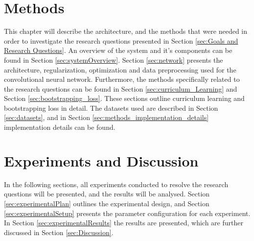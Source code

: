 \documentclass[a4paper]{book}
\begin{document}
\chapter{Methods}
\label{cha:architectureAndModel}
This chapter will describe the architecture, and the methods that were needed in order to investigate the research questions presented in Section \ref{sec:Goals and Research Questions}. An overview of the system and it's components can be found in Section \ref{sec:systemOverview}. Section \ref{sec:network} presents the architecture, regularization, optimization and data preprocessing used for the convolutional neural network. Furthermore, the methods specifically related to the research questions can be found in Section \ref{sec:curriculum_Learning} and Section \ref{sec:bootstrapping_loss}. These sections outline curriculum learning and bootstrapping loss in detail. The datasets used are described in Section \ref{sec:datasets}, and in Section \ref{sec:methods_implementation_details} implementation details can be found.














\chapter{Experiments and Discussion}
In the following sections, all experiments conducted to resolve the research questions will be presented, and the results will be analysed. Section \ref{sec:experimentalPlan} outlines the experimental design, and Section \ref{sec:experimentalSetup} presents the parameter configuration for each experiment. In Section \ref{sec:experimentalResults} the results are presented, which are further discussed in Section \ref{sec:Discussion}.
\label{cha:ResearchAndResults}








\end{document}
